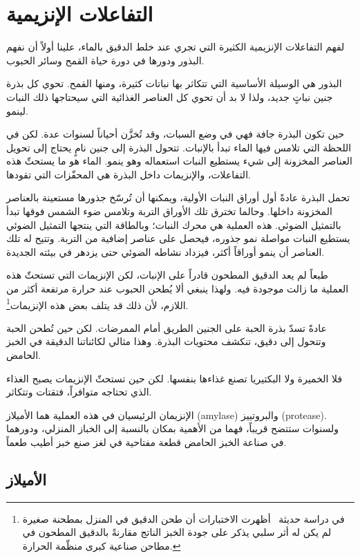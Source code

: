 \section{التفاعلات الإنزيمية}

لفهم التفاعلات الإنزيمية الكثيرة التي تجري عند خلط الدقيق بالماء، علينا أولاً أن نفهم البذور ودورها في دورة حياة القمح وسائر الحبوب.

البذور هي الوسيلة الأساسية التي تتكاثر بها نباتات كثيرة، ومنها القمح. تحوي كل بذرة جنين نباتٍ جديد، ولذا لا بد أن تحوي كل العناصر الغذائية التي سيحتاجها ذلك النبات لينمو.

حين تكون البذرة جافة فهي في وضع السبات، وقد تُخزَّن أحياناً لسنوات عدة. لكن في اللحظة التي تلامس فيها الماء تبدأ بالإنبات. تتحول البذرة إلى جنين نامٍ يحتاج إلى تحويل العناصر المخزونة إلى شيء يستطيع النبات استعماله وهو ينمو. الماء هو ما يستحثّ هذه التفاعلات، والإنزيمات داخل البذرة هي المحفّزات التي تقودها.

تحمل البذرة عادةً أول أوراق النبات الأولية، ويمكنها أن تُرسّخ جذورها مستعينة بالعناصر المخزونة داخلها. وحالما تخترق تلك الأوراق التربة وتلامس ضوء الشمس فوقها تبدأ بالتمثيل الضوئي. هذه العملية هي محرك النبات؛ وبالطاقة التي ينتجها التمثيل الضوئي يستطيع النبات مواصلة نمو جذوره، فيحصل على عناصر إضافية من التربة. وتتيح له تلك العناصر أن ينمو أوراقاً أكثر، فيزداد نشاطه الضوئي حتى يزدهر في بيئته الجديدة.

طبعاً لم يعد الدقيق المطحون قادراً على الإنبات، لكن الإنزيمات التي تستحثّ هذه العملية ما زالت موجودة فيه. ولهذا ينبغي ألا يُطحن الحبوب عند حرارة مرتفعة أكثر من اللازم، لأن ذلك قد يتلف بعض هذه الإنزيمات\footnote{في دراسة حديثة~\cite{milling+commercial+home+mill+comparison} أظهرت الاختبارات أن طحن الدقيق في المنزل بمطحنة صغيرة لم يكن له أثر سلبي يذكر على جودة الخبز الناتج مقارنةً بالدقيق المطحون في مطاحن صناعية كبرى منظّمة الحرارة.}.

عادةً تسدّ بذرة الحبة على الجنين الطريق أمام الممرضات. لكن حين تُطحن الحبة وتتحول إلى دقيق، تنكشف محتويات البذرة. وهذا مثالي لكائناتنا الدقيقة في الخبز الحامض.

فلا الخميرة ولا البكتيريا تصنع غذاءها بنفسها. لكن حين تستحثّ الإنزيمات يصبح الغذاء الذي تحتاجه متوافراً، فتقتات وتتكاثر.

الإنزيمان الرئيسيان في هذه العملية هما الأميلاز \textenglish{(amylase)} والبروتييز \textenglish{(protease)}. ولسنوات ستتضح قريباً، فهما من الأهمية بمكان بالنسبة إلى الخباز المنزلي، ودورهما في صناعة الخبز الحامض قطعة مفتاحية في لغز صنع خبز أطيب طعماً.

\subsection{الأميلاز}

